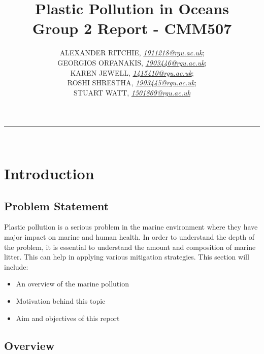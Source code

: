 \documentclass[10pt]{article}\usepackage[]{graphicx}\usepackage[]{color}
\begin{document}
\title{\LARGE Plastic Pollution in Oceans  \\ Group 2 Report - CMM507}

\author{ALEXANDER RITCHIE, \textit{\href{1911218@rgu.ac.uk}{1911218@rgu.ac.uk}};\\ GEORGIOS ORFANAKIS, \textit{\href{1903446@rgu.ac.uk}{1903446@rgu.ac.uk}};\\ KAREN JEWELL, \textit{\href{1415410@rgu.ac.uk}{1415410@rgu.ac.uk}};\\ ROSHI SHRESTHA, \textit{\href{1903445@rgu.ac.uk}{1903445@rgu.ac.uk}};\\ STUART WATT, \textit{\href{1501869@rgu.ac.uk}{1501869@rgu.ac.uk}}}

\maketitle
\noindent\rule{16cm}{0.4pt}
\ \\

\section{Introduction}



\subsection{Problem Statement}\label{statement}

Plastic pollution is a serious problem in the marine environment where they have major impact on marine and human health. In order to understand the depth of the problem, it is essential to understand the amount and composition of marine litter. This can help in applying various mitigation strategies. This section will include:
\begin{itemize}
\item An overview of the marine pollution
\item Motivation behind this topic
\item Aim and objectives of this report
\end{itemize}


\subsection{Overview}\label{over}
\end{document}
